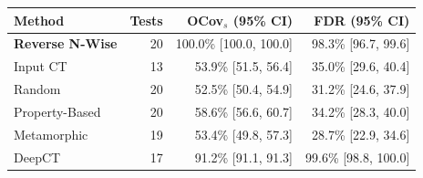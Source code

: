 \begin{tabular}{lrrr}
\toprule
Method & Tests & OCov$_s$ (95\% CI) & FDR (95\% CI) \\
\midrule
\textbf{Reverse N-Wise} & 20 & 100.0\% [100.0, 100.0] & 98.3\% [96.7, 99.6] \\
Input CT & 13 & 53.9\% [51.5, 56.4] & 35.0\% [29.6, 40.4] \\
Random & 20 & 52.5\% [50.4, 54.9] & 31.2\% [24.6, 37.9] \\
Property-Based & 20 & 58.6\% [56.6, 60.7] & 34.2\% [28.3, 40.0] \\
Metamorphic & 19 & 53.4\% [49.8, 57.3] & 28.7\% [22.9, 34.6] \\
DeepCT & 17 & 91.2\% [91.1, 91.3] & 99.6\% [98.8, 100.0] \\
\bottomrule
\end{tabular}